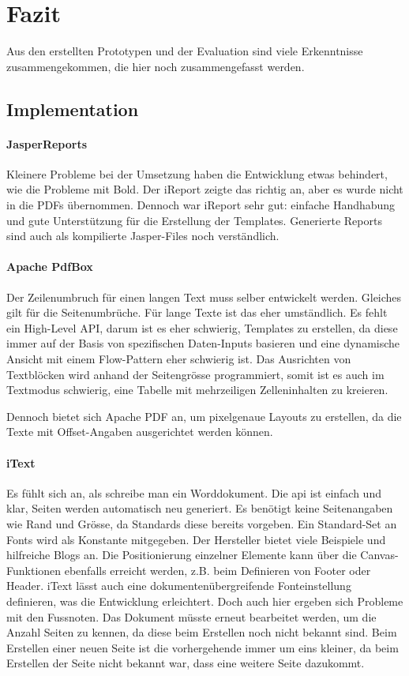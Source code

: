 \documentclass[main.tex]{subfiles}
\begin{document}
\chapter{Fazit}

Aus den erstellten Prototypen und der Evaluation sind viele Erkenntnisse zusammengekommen, die hier noch zusammengefasst werden. 

\section{Implementation}

\subsubsection{JasperReports}
Kleinere Probleme bei der Umsetzung haben die Entwicklung etwas behindert, wie die Probleme mit Bold. Der iReport zeigte das richtig an, aber es wurde nicht in die PDFs übernommen. Dennoch war iReport sehr gut: einfache Handhabung und gute Unterstützung für die Erstellung der Templates. Generierte Reports sind auch als kompilierte Jasper-Files noch verständlich.  


\subsubsection{Apache PdfBox}
Der Zeilenumbruch für einen langen Text muss selber entwickelt werden. Gleiches gilt für die Seitenumbrüche. Für lange Texte ist das eher umständlich. Es fehlt ein High-Level API, darum ist es eher schwierig, Templates zu erstellen, da diese immer auf der Basis von spezifischen Daten-Inputs basieren und eine dynamische Ansicht mit einem Flow-Pattern eher schwierig ist. Das Ausrichten von Textblöcken wird anhand der Seitengrösse programmiert, somit ist es auch im Textmodus schwierig, eine Tabelle mit mehrzeiligen Zelleninhalten zu kreieren.

Dennoch bietet sich Apache PDF an, um pixelgenaue Layouts zu erstellen, da die Texte mit Oﬀset-Angaben ausgerichtet werden können.

\subsubsection{iText}
Es fühlt sich an, als schreibe man ein Worddokument. Die \acrlong{api} ist einfach und klar, Seiten werden automatisch neu generiert. Es benötigt keine Seitenangaben wie Rand und Grösse, da Standards diese bereits vorgeben. Ein Standard-Set an Fonts wird als Konstante mitgegeben. Der Hersteller bietet viele Beispiele und hilfreiche Blogs an. 
Die Positionierung einzelner Elemente kann über die Canvas-Funktionen ebenfalls erreicht werden, z.B. beim Definieren von Footer oder Header. 
iText lässt auch eine dokumentenübergreifende Fonteinstellung definieren, was die Entwicklung erleichtert. 
Doch auch hier ergeben sich Probleme mit den Fussnoten. Das Dokument müsste erneut bearbeitet werden, um die Anzahl Seiten zu kennen, da diese beim Erstellen noch nicht bekannt sind. Beim Erstellen einer neuen Seite ist die vorhergehende immer um eins kleiner, da beim Erstellen der Seite nicht bekannt war, dass eine weitere Seite dazukommt.
\end{document}
